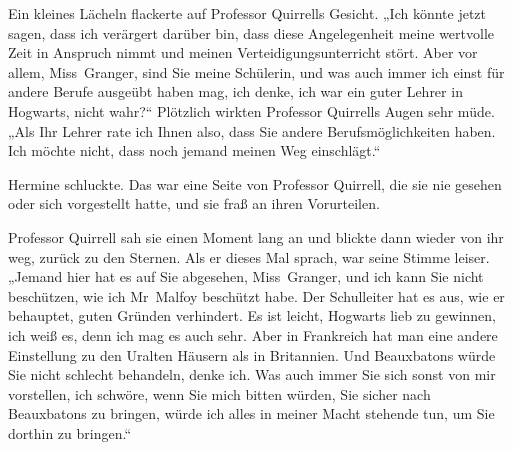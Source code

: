 Ein kleines Lächeln flackerte auf Professor Quirrells Gesicht. „Ich könnte jetzt sagen, dass ich verärgert darüber bin, dass diese Angelegenheit meine wertvolle Zeit in Anspruch nimmt und meinen Verteidigungsunterricht stört. Aber vor allem, Miss~Granger, sind Sie meine Schülerin, und was auch immer ich einst für andere Berufe ausgeübt haben mag, ich denke, ich war ein guter Lehrer in Hogwarts, nicht wahr?“ Plötzlich wirkten Professor Quirrells Augen sehr müde.
„Als Ihr Lehrer rate ich Ihnen also, dass Sie andere Berufsmöglichkeiten haben. Ich möchte nicht, dass noch jemand meinen Weg einschlägt.“

Hermine schluckte. Das war eine Seite von Professor Quirrell, die sie nie gesehen oder sich vorgestellt hatte, und sie fraß an ihren Vorurteilen.

Professor Quirrell sah sie einen Moment lang an und blickte dann wieder von ihr weg, zurück zu den Sternen. Als er dieses Mal sprach, war seine Stimme leiser. „Jemand hier hat es auf Sie abgesehen, Miss~Granger, und ich kann Sie nicht beschützen, wie ich Mr~Malfoy beschützt habe. Der Schulleiter hat es aus, wie er behauptet, guten Gründen verhindert. Es ist leicht, Hogwarts lieb zu gewinnen, ich weiß es, denn ich mag es auch sehr. Aber in Frankreich hat man eine andere Einstellung zu den Uralten Häusern als in Britannien. Und Beauxbatons würde Sie nicht schlecht behandeln, denke ich. Was auch immer Sie sich sonst von mir vorstellen, ich schwöre, wenn Sie mich bitten würden, Sie sicher nach Beauxbatons zu bringen, würde ich alles in meiner Macht stehende tun, um Sie dorthin zu bringen.“

